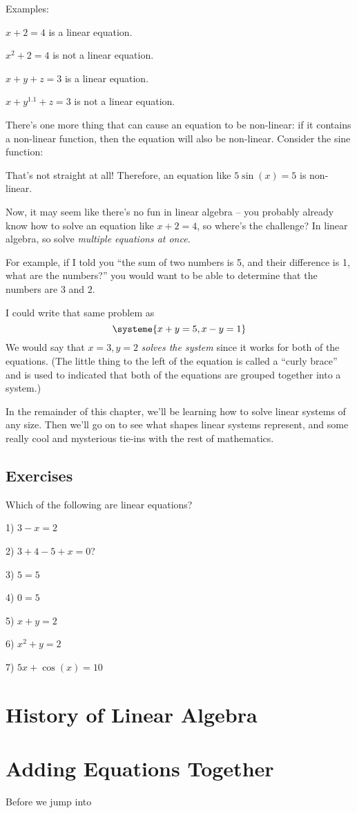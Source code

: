 \documentclass[a4paper,twoside,12pt]{memoir}  %
\begin{document}
Examples:
\begin{list}{}
\item $x + 2 = 4$ is a linear equation.
\item $x^2 + 2 = 4$ is not a linear equation.
\item $x + y + z = 3$ is a linear equation.
\item $x + y^{1.1} + z = 3$ is not a linear equation.
\end{list}

There's one more thing that can cause an equation to be non-linear: if it contains a non-linear function, then the equation will also be non-linear. Consider the sine function:


That's not straight at all! Therefore, an equation like $5 \sin(x) = 5$ is non-linear.

Now, it may seem like there's no fun in linear algebra -- you probably already know how to solve an equation like $x + 2 = 4$, so where's the challenge?
In linear algebra, so solve \textit{multiple equations at once}.

For example, if I told you ``the sum of two numbers is 5, and their difference is 1, what are the numbers?'' you would want to be able to determine that the numbers are $3$ and $2$.

I could write that same problem as
\begin{equation*}
  \systeme{
    x + y = 5,
    x - y = 1
    }
\end{equation*}
We would say that $x = 3, y = 2$ \textit{solves the system} since it works for both of the equations.
(The little thing to the left of the equation is called a ``curly brace'' and is used to indicated that both of the equations are grouped together into a system.)

In the remainder of this chapter, we'll be learning how to solve linear systems of any size.
Then we'll go on to see what shapes linear systems represent, and some really cool and mysterious tie-ins with the rest of mathematics.

\subsection{Exercises}
Which of the following are linear equations?
\begin{list}{}
\item 1) $3 - x = 2$
\item 2) $3 + 4 -5 + x = 0$?
\item 3) $5 = 5$
\item 4) $0 = 5$
\item 5) $x + y = 2$
\item 6) $x^2 + y = 2$
\item 7) $5x + \cos(x) = 10$
\end{list}

\section{History of Linear Algebra}

\section{Adding Equations Together}
Before we jump into 
\end{document}
